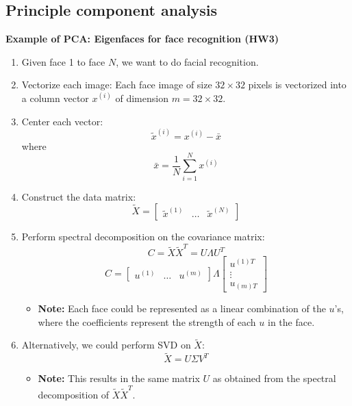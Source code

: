 \subsection{Principle component analysis}
\begin{example}
    \textbf{Example of PCA: Eigenfaces for face recognition (HW3)}
    \begin{enumerate}
        \item Given face 1 to face $N$, we want to do facial recognition. 
        \item Vectorize each image: Each face image of size \( 32 \times 32 \) pixels is vectorized into a column vector \( x^{(i)} \) of dimension \( m = 32 \times 32 \).

        \item Center each vector: 
           \[
           \tilde{x}^{(i)} = x^{(i)} - \bar{x}
           \]
           where 
           \[
           \bar{x} = \frac{1}{N} \sum_{i=1}^{N} x^{(i)}
           \]
        
        \item Construct the data matrix:
           \[
           \tilde{X} = \begin{bmatrix} \tilde{x}^{(1)} & \ldots & \tilde{x}^{(N)} \end{bmatrix}
           \]
        
        \item Perform spectral decomposition on the covariance matrix:
           \[
           C = \tilde{X} \tilde{X}^T = U \Lambda U^T
           \]
           \[
            C= 
            \begin{bmatrix}
            u^{(1)} & \ldots & u^{(m)}
            \end{bmatrix}
            \Lambda
            \begin{bmatrix}
            u^{(1)T} \\
            \vdots \\
            u_{(m)T}
            \end{bmatrix}
            \]
            \begin{itemize}
                \item \textbf{Note:} Each face could be represented as a linear combination of the \( u \)'s, where the coefficients represent the strength of each \( u \) in the face.
            \end{itemize}
        
        \item Alternatively, we could perform SVD on \( \tilde{X} \):
        \[
        \tilde{X} = U \Sigma V^T
        \]
        \begin{itemize}
            \item \textbf{Note:} This results in the same matrix \( U \) as obtained from the spectral decomposition of \( \tilde{X} \tilde{X}^T \). 
        \end{itemize}
    \end{enumerate}
\end{example}

